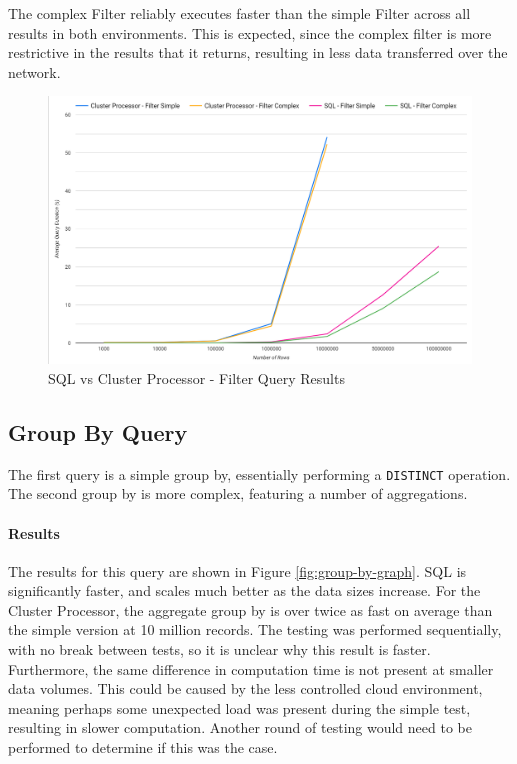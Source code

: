 The complex Filter reliably executes faster than the simple Filter across all results in both environments.
This is expected, since the complex filter is more restrictive in the results that it returns, resulting in less data transferred over the network.

\begin{figure}[htp]
	\centering
	\includegraphics[width=0.8\linewidth]{chapters/diagrams/testing/filter-1k-100m}
	\caption{SQL vs Cluster Processor - Filter Query Results} 
	\label{fig:filter-graph}
\end{figure}


\subsection{Group By Query}
The first query is a simple group by, essentially performing a \texttt{DISTINCT} operation. 
The second group by is more complex, featuring a number of aggregations. %

\paragraph{Results}
The results for this query are shown in Figure \ref{fig:group-by-graph}. SQL is significantly faster, and scales much better as the data sizes increase. For the Cluster Processor, the aggregate group by is over twice as fast on average than the simple version at 10 million records. The testing was performed sequentially, with no break between tests, so it is unclear why this result is faster. Furthermore, the same difference in computation time is not present at smaller data volumes. This could be caused by the less controlled cloud environment, meaning perhaps some unexpected load was present during the simple test, resulting in slower computation. Another round of testing would need to be performed to determine if this was the case.

